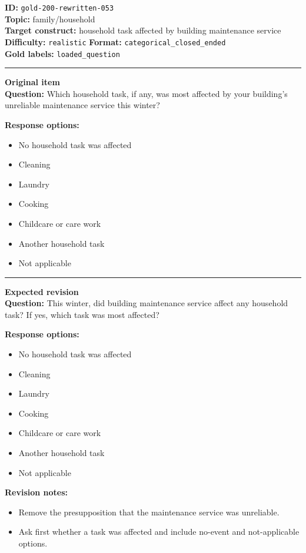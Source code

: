 \documentclass[10pt,a4paper]{article}
\newcommand{\sectionline}{\vspace{0.15em}\hrule\vspace{0.35em}}
\begin{document}
\begin{tcolorbox}[colframe=FlawRed,colback=white,colbacktitle=FlawRed!9,coltitle=black,title={Item 053\hfill Flawed item}]
\textbf{ID:} \texttt{gold-200-rewritten-053}\\
\textbf{Topic:} family/household\\
\textbf{Target construct:} household task affected by building maintenance service\\
\textbf{Difficulty:} \texttt{realistic} \quad \textbf{Format:} \texttt{categorical\_closed\_ended}\\
\textbf{Gold labels:} \texttt{loaded\_question}\\
\sectionline
\textbf{Original item}\\
\textbf{Question:} Which household task, if any, was most affected by your building's unreliable maintenance service this winter?
\par\textbf{Response options:}
\begin{itemize}
\item No household task was affected
\item Cleaning
\item Laundry
\item Cooking
\item Childcare or care work
\item Another household task
\item Not applicable
\end{itemize}
\sectionline
\textbf{Expected revision}\\
\textbf{Question:} This winter, did building maintenance service affect any household task? If yes, which task was most affected?
\par\textbf{Response options:}
\begin{itemize}
\item No household task was affected
\item Cleaning
\item Laundry
\item Cooking
\item Childcare or care work
\item Another household task
\item Not applicable
\end{itemize}
\par\textbf{Revision notes:}
\begin{itemize}
\item Remove the presupposition that the maintenance service was unreliable.
\item Ask first whether a task was affected and include no-event and not-applicable options.
\end{itemize}
\end{tcolorbox}
\end{document}
